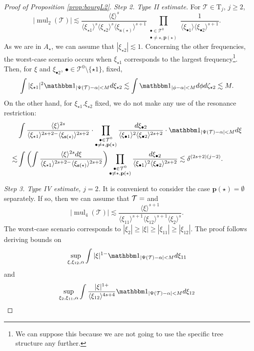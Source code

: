 \documentclass[a4paper,
11pt,  reqno]{amsart}
\makeatletter
\newcommand{\jap}[1]{\langle #1 \rangle}
\newcommand{\5}{\textup{V}}
\newcommand{\noi}{\noindent}
\newcommand{\ind}{\mathbbm 1}
\theoremstyle{remark}
\newcommand{\bul}{\bullet}
\newcommand{\TT}{\mathcal{T}}
\newcommand{\Tr}{\mathrm{T}}
\newcommand{\pb}{\mathbf{p}}
\newcommand{\sbf}{\mathbf{s}}
\DeclareMathOperator{\mul}{mul}
\def\<#1>{\csname MH@symb@#1\endcsname}
\numberwithin{equation}{section}
\numberwithin{theorem}{section}
\makeatother
\begin{document}
\begin{proof}[Proof of Proposition \ref{prop:bourgL2}]
\noi\textit{Step 2. Type II estimate.} For $\TT\in \Tr_j$, $j\ge 2$,
$$
|\mul_2(\TT)| \lesssim \frac{\jap{\xi}^s}{\jap{\xi_{\star1}}^{s}\jap{\xi_{\star2}}^{s}\jap{\xi_{\sbf(\star)}}^{s+1}}\prod_{\substack{\bul\in\TT^0\\\bul\neq \star, \pb(\star)}} \frac{1}{\jap{\xi_{\bul1}}\jap{\xi_{\bul2}}^{s+1}}.
$$
As we are in $A_\star$, we can assume that $|\xi_{\star2}|\lesssim 1$. Concerning the other frequencies, the worst-case scenario occurs when $\xi_{\star1}$ corresponds to the largest frequency\footnote{We can suppose this because we are not going to use the specific tree structure any further.}. Then, for $\xi$ and $\xi_{\bul2}$, $\bul\in \TT^0\setminus\{\star1\}$, fixed,
\begin{equation}
\int |\xi_{\star1}|^2\ind_{|\Psi(\TT)-\alpha|<M} d\xi_{\star2} \lesssim \int \ind_{|\phi-\alpha|<M} d\phi d\zeta_{\star2} \lesssim M.
\end{equation}
On the other hand, for $\xi_{\star1}. \xi_{\star2}$ fixed, we do not make any use of the resonance restriction:
\begin{align*}
&\int \frac{\jap{\xi}^{2s}}{\jap{\xi_{\star1}}^{2s+2-}\jap{\xi_{\sbf(\star)}}^{2s+2}}\cdot\prod_{\substack{\bul\in\TT^0\\\bul\neq \star, \pb(\star)}} \frac{d\xi_{\bul2}}{\jap{\xi_{\bul1}}^2\jap{\xi_{\bul2}}^{2s+2}}\cdot \ind_{|\Psi(\TT)-\alpha|<M} d\xi\\\lesssim & \int\left(\int \frac{\jap{\xi}^{2s}d\xi}{\jap{\xi_{\star1}}^{2s+2-}\jap{\xi_{\sbf(\star)}}^{2s+2}}\right)\prod_{\substack{\bul\in\TT^0\\\bul\neq \star, \pb(\star)}} \frac{d\xi_{\bul2}}{\jap{\xi_{\bul1}}^2\jap{\xi_{\bul2}}^{2s+2}} \lesssim \delta^{(2s+2)(j-2)}.
\end{align*}


\medskip

\noi \textit{Step 3. Type IV estimate, $j=2$.} It is convenient to consider the case $\pb(\star)=\emptyset$ separately. If so, then we can assume that $\TT=\<21>$ and 
\begin{equation}
\label{typeIVmult2}
|\mul_4(\TT)|\lesssim \frac{\jap{\xi}^{s+1}}{\jap{\xi_{11}}^{s+1}\jap{\xi_{12}}^{s+1}\jap{\xi_2}^s}.
\end{equation}
The worst-case scenario corresponds to $|\xi_2|\ge |\xi|\ge |\xi_{11}|\ge |\xi_{12}|$. The proof follows deriving bounds on
\begin{equation}\label{eq:type4interp1}
\sup_{\xi,\xi_{12},\alpha} \int |\xi|^{1-} \ind_{|\Psi(\TT)-\alpha|<M}d\xi_{11}
\end{equation}
and
\begin{equation}\label{eq:type4interp2}
\sup_{\xi_2,\xi_{11},\alpha} \int \frac{|\xi|^{1+}}{\jap{\xi_{12}}^{4s+4}}\ind_{|\Psi(\TT)-\alpha|<M}d\xi_{12}
\end{equation}


\end{proof}
\end{document}
